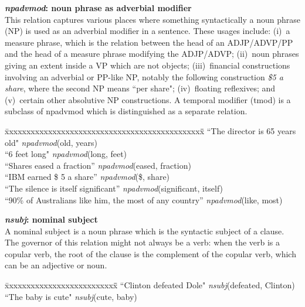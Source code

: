 \documentclass[11pt,letter]{article}
\begin{document}
\noindent\textbf{\emph{npadvmod}: noun phrase as adverbial modifier}\\
This relation captures various places where something syntactically a noun phrase (NP) is used as an adverbial modifier in a sentence.   These usages include: (i)~a measure phrase, which is the relation between
the head of an ADJP/ADVP/PP and the head of a measure phrase modifying the ADJP/ADVP; (ii)~noun phrases giving an extent inside a VP which are not objects; (iii)~financial constructions involving an adverbial or PP-like NP, notably
the following construction \emph{\$5 a share}, where the second NP means ``per share"; (iv)~floating reflexives; and (v)~certain other absolutive NP constructions.
A temporal modifier (tmod) is a subclass of npadvmod which is distinguished as a separate relation.
\begin{tabbing}
\hspace{1cm} \= xxxxxxxxxxxxxxxxxxxxxxxxxxxxxxxxxxxxxxxxxxxxxx\= \hspace{.5cm}\=  \kill
\>  ``The director is 65 years old" \> \> \emph{npadvmod}(old, years)\\
\> ``6 feet long" \> \> \emph{npadvmod}(long, feet)\\
\> ``Shares eased a fraction'' \>\> \emph{npadvmod}(eased, fraction)\\
\> ``IBM earned \$ 5 a share'' \>\> \emph{npadvmod}(\$, share)\\
\> ``The silence is itself significant'' \>\> \emph{npadvmod}(significant, itself) \\
\>  ``90\% of Australians like him, the most of any country'' \>\> \emph{npadvmod}(like, most)
\end{tabbing}

\noindent\textbf{\emph{nsubj}: nominal subject}\\
A nominal subject is a noun phrase which is the syntactic subject of a clause. The governor of this relation might not always be a verb: when the verb is a copular verb, the root of the clause is the complement of the copular verb, which can be an adjective or noun.
\begin{tabbing}
\hspace{1cm} \= xxxxxxxxxxxxxxxxxxxxxxxxxx\= \hspace{.5cm}\=  \kill
\>  ``Clinton defeated Dole" \> \> \emph{nsubj}(defeated, Clinton)\\
\hspace{1cm} \> ``The baby is cute" \> \> \emph{nsubj}(cute, baby)\\
\end{tabbing}
\end{document}
